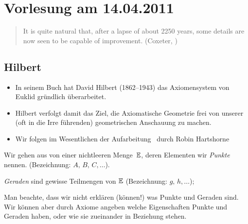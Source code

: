 \section*{Vorlesung am 14.04.2011}

\begin{quote}
It is quite natural that, after a lapse of about 2250 years, some
details are now seen to be capable of improvement.
(Coxeter, \cite[Section 1.2]{coxeter-1969})
\end{quote}

\subsection*{Hilbert}

\begin{itemize}
\item In seinem Buch \cite{hilbert} hat David Hilbert (1862--1943) 
das Axiomensystem von Euklid gründlich überarbeitet.

\item Hilbert verfolgt damit das Ziel, die Axiomatische Geometrie frei
  von unserer (oft in die Irre führenden) geometrischen Anschauung zu machen.

\item Wir folgen im Wesentlichen der Aufarbeitung~\cite{hartshorne-2000} durch Robin
  Hartshorne

\end{itemize}






Wir gehen aus von einer nichtleeren Menge~$\mathbb E$, deren Elementen wir 
{\em Punkte} nennen. (Bezeichnung: $A,\,B,\,C,\ldots$).

{\em Geraden} sind gewisse Teilmengen von $\mathbb E$
(Bezeichnung: $g,\,h,\ldots$);

Man beachte, dass wir nicht erklären (können!) \glqq was Punkte und Geraden
sind\grqq . Wir können aber durch 
Axiome angeben welche Eigenschaften 
Punkte und Geraden haben, oder wie sie zueinander in Beziehung stehen.


